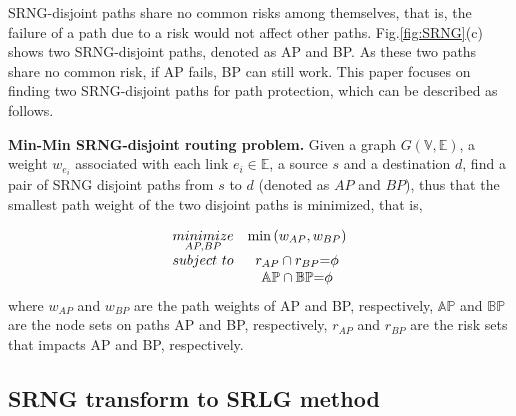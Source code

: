 SRNG-disjoint paths share no common risks among themselves, that is, the failure of a path due to a risk would not affect other paths. Fig.\ref{fig:SRNG}(c) shows two SRNG-disjoint paths, denoted as AP and BP. As these two paths share no common risk, if AP fails, BP can still work. This paper focuses on finding  two SRNG-disjoint paths for path protection, which can be described as follows.


\textbf{Min-Min SRNG-disjoint routing problem.} Given a graph $G(\mathbb{V},\mathbb{E})$, a weight $w_{e_i}$ associated with each link $e_i\in \mathbb{E}$, a source  $s$ and a destination  $d$,  find a pair of SRNG disjoint paths from $s$ to $d$ (denoted as $AP$ and $BP$), thus that  the smallest path weight of the two disjoint paths is minimized, that is,

\begin{equation}
\begin{array}{*{20}{c}}
   {\mathop {minimize}\limits_{AP,BP} } & {\min \left( {{w_{AP}},{w_{BP}}} \right)}  \\
   {subject\ to} & {{r_{AP}} \cap {r_{BP}}{\rm{ = }}\phi }  \\
   {} & {\mathbb{AP} \cap \mathbb{BP}{\rm{ = }}\phi }  \\
\end{array}
\label{eq:problem definition}
\end{equation}
where ${w_{AP}}$ and ${w_{BP}}$ are the path weights of AP and BP, respectively, $\mathbb{AP}$ and $\mathbb{BP}$ are the node sets on paths AP and BP, respectively, ${r_{AP}}$ and ${r_{BP}}$ are the risk sets that impacts AP and BP, respectively.


\subsection{SRNG transform to SRLG method}




